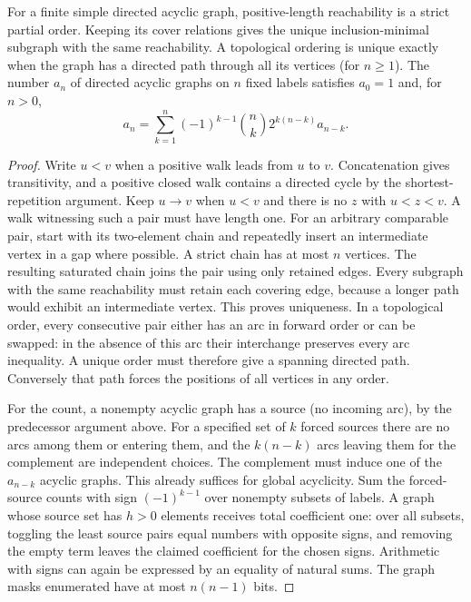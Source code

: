 \begin{corollary}\leavevmode\label{stdagenum}
For a finite simple directed acyclic graph, positive-length reachability is a strict partial order. Keeping its cover relations gives the unique inclusion-minimal subgraph with the same reachability. A topological ordering is unique exactly when the graph has a directed path through all its vertices (for $n\ge1$). The number $a_n$ of directed acyclic graphs on $n$ fixed labels satisfies $a_0=1$ and, for $n>0$,
\[
 a_n=\sum_{k=1}^{n}(-1)^{k-1}\binom nk 2^{k(n-k)}a_{n-k}.
\]
\end{corollary}
\begin{proof}
Write $u<v$ when a positive walk leads from $u$ to $v$. Concatenation gives transitivity, and a positive closed walk contains a directed cycle by the shortest-repetition argument. Keep $u\to v$ when $u<v$ and there is no $z$ with $u<z<v$. A walk witnessing such a pair must have length one. For an arbitrary comparable pair, start with its two-element chain and repeatedly insert an intermediate vertex in a gap where possible. A strict chain has at most $n$ vertices. The resulting saturated chain joins the pair using only retained edges. Every subgraph with the same reachability must retain each covering edge, because a longer path would exhibit an intermediate vertex. This proves uniqueness. In a topological order, every consecutive pair either has an arc in forward order or can be swapped: in the absence of this arc their interchange preserves every arc inequality. A unique order must therefore give a spanning directed path. Conversely that path forces the positions of all vertices in any order.

For the count, a nonempty acyclic graph has a source (no incoming arc), by the predecessor argument above. For a specified set of $k$ forced sources there are no arcs among them or entering them, and the $k(n-k)$ arcs leaving them for the complement are independent choices. The complement must induce one of the $a_{n-k}$ acyclic graphs. This already suffices for global acyclicity. Sum the forced-source counts with sign $(-1)^{k-1}$ over nonempty subsets of labels. A graph whose source set has $h>0$ elements receives total coefficient one: over all subsets, toggling the least source pairs equal numbers with opposite signs, and removing the empty term leaves the claimed coefficient for the chosen signs. Arithmetic with signs can again be expressed by an equality of natural sums. The graph masks enumerated have at most $n(n-1)$ bits.
\end{proof}

